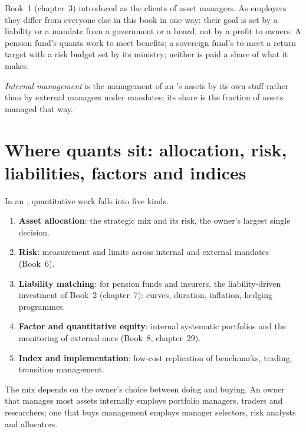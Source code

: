 Book~1 (chapter~3) introduced  as the clients of asset managers. As employers they differ from everyone else
in this book in one way: their goal is set by a liability or a mandate from a government or a board, not by a profit to
owners. A pension fund's quants work to meet benefits; a sovereign fund's to meet a return target with a risk budget set
by its ministry; neither is paid a share of what it makes.

\begin{definition}\label{def:in:asset-managers-pensions-sovereign-funds-and-insurers:internal}
\emph{Internal management} is the management of an 's assets by its own staff
rather than by external managers under mandates; its share is the fraction of assets managed that way.
\end{definition}

\section{Where quants sit: allocation, risk, liabilities, factors and indices}

In an , quantitative work falls into five kinds.
\begin{enumerate}
\item \textbf{Asset allocation}: the strategic mix and its risk, the owner's largest single decision.
\item \textbf{Risk}: measurement and limits across internal and external mandates (Book~6).
\item \textbf{Liability matching}: for pension funds and insurers, the liability-driven investment of Book~2 (chapter~7):
curves, duration, inflation, hedging programmes.
\item \textbf{Factor and quantitative equity}: internal systematic portfolios and the monitoring of external ones
(Book~8, chapter~29).
\item \textbf{Index and implementation}: low-cost replication of benchmarks, trading, transition management.
\end{enumerate}
The mix depends on the owner's choice between doing and buying. An owner that manages most assets internally employs
portfolio managers, traders and researchers; one that buys management employs manager selectors, risk analysts and
allocators.

